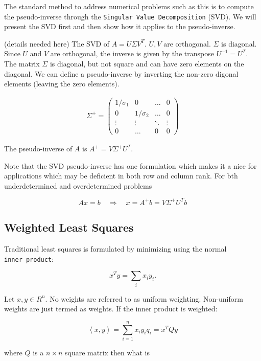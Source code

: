 The standard method to address numerical problems such as this is to
compute the pseudo-inverse through the
\texttt{Singular\ Value\ Decomposition} (SVD). We will present the SVD
first and then show how it applies to the pseudo-inverse.

(details needed here) The SVD of \(A = U \Sigma V^T\). \(U,V\) are
orthogonal. \(\Sigma\) is diagonal. Since \(U\) and \(V\) are
orthogonal, the inverse is given by the transpose \(U^{-1} = U^T\). The
matrix \(\Sigma\) is diagonal, but not square and can have zero elements
on the diagonal. We can define a pseudo-inverse by inverting the
non-zero digonal elements (leaving the zero elements).

\[\begin{aligned}
\Sigma^+ = \begin{pmatrix} 1/\sigma_1 & 0 & \dots & 0 \\
           0 & 1/\sigma_2 & \dots & 0 \\
           \vdots & \vdots & \ddots & \vdots \\
           0 & \dots & 0 & 0 
           \end{pmatrix}
\end{aligned}\]

The pseudo-inverse of \(A\) is \(A^+ = V \Sigma^+ U^T\).

Note that the SVD pseudo-inverse has one formulation which makes it a
nice for applications which may be deficient in both row and column
rank. For bth underdetermined and overdetermined problems

\[Ax = b \quad \Rightarrow \quad x = A^+ b = V \Sigma^+ U^T b\]

\hypertarget{weighted-least-squares}{%
\subsection{Weighted Least Squares}\label{weighted-least-squares}}

Traditional least squares is formulated by minimizing using the normal
\texttt{inner\ product}:

\[x^Ty = \sum_i x_iy_i.\]

Let \(x, y\in R^n\). No weights are referred to as uniform weighting.
Non-uniform weights are just termed as weights. If the inner product is
weighted:

\[\left< x, y \right> = \sum_{i=1}^n x_i y_i q_i = x^T Q y\]

where \(Q\) is a \(n \times n\) square matrix then what is

